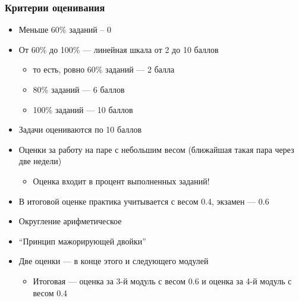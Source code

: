 \documentclass[xetex,mathserif,serif]{beamer}
\begin{document}
    \begin{frame}
        \frametitle{Критерии оценивания}
        \begin{itemize}
            \item Меньше 60\% заданий -- 0
            \item От 60\% до 100\% --- линейная шкала от 2 до 10 баллов
            \begin{itemize}
                \item то есть, ровно 60\% заданий --- 2 балла
                \item 80\% заданий --- 6 баллов
                \item 100\% заданий --- 10 баллов
            \end{itemize}
            \item Задачи оцениваются по 10 баллов
            \item Оценки за работу на паре с небольшим весом (ближайшая такая пара через две недели)
            \begin{itemize}
                \item Оценка входит в процент выполненных заданий!
            \end{itemize}
            \item В итоговой оценке практика учитывается с весом 0.4, экзамен --- 0.6
            \item Округление арифметическое
            \item ``Принцип мажорирующей двойки''
            \item Две оценки --- в конце этого и следующего модулей
            \begin{itemize}
                \item Итоговая --- оценка за 3-й модуль с весом 0.6 и оценка за 4-й модуль с весом 0.4
            \end{itemize}
        \end{itemize}
    \end{frame}
\end{document}
